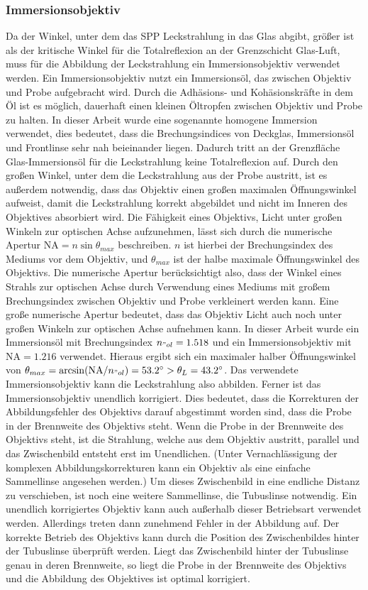 \documentclass[titlepage,  ngerman]{article}
\begin{document}
	\subsubsection{Immersionsobjektiv}
	Da der Winkel, unter dem das SPP Leckstrahlung in das Glas abgibt, größer ist als der kritische Winkel für die Totalreflexion an der Grenzschicht Glas-Luft, muss für die Abbildung der Leckstrahlung ein Immersionsobjektiv verwendet werden. Ein Immersionsobjektiv nutzt ein Immersionsöl, das zwischen Objektiv und Probe aufgebracht wird. Durch die Adhäsions- und Kohäsionskräfte in dem Öl ist es möglich, dauerhaft einen kleinen Öltropfen zwischen Objektiv und Probe zu halten. In dieser Arbeit  wurde eine sogenannte homogene Immersion verwendet, dies bedeutet, dass die Brechungsindices von Deckglas, Immersionsöl und Frontlinse sehr nah beieinander liegen. Dadurch tritt an der Grenzfläche Glas-Immersionsöl für die Leckstrahlung keine Totalreflexion auf. Durch den großen Winkel, unter dem die Leckstrahlung aus der Probe austritt, ist es außerdem notwendig, dass das Objektiv einen großen maximalen Öffnungswinkel aufweist, damit die Leckstrahlung korrekt abgebildet und nicht im Inneren des Objektives absorbiert wird. Die Fähigkeit eines Objektivs, Licht unter großen Winkeln zur optischen Achse aufzunehmen, lässt sich durch die numerische Apertur $\mathrm{NA} = n\sin\theta_{max}$ beschreiben. $n$ ist hierbei der Brechungsindex des Mediums vor dem Objektiv, und $\theta_{max}$ ist der halbe maximale Öffnungswinkel des Objektivs. Die numerische Apertur berücksichtigt also, dass der Winkel eines Strahls zur optischen Achse durch Verwendung eines Mediums mit großem Brechungsindex zwischen Objektiv und Probe verkleinert werden kann. Eine große numerische Apertur bedeutet, dass das Objektiv Licht auch noch unter großen Winkeln zur optischen Achse aufnehmen kann. In dieser Arbeit wurde ein Immersionsöl mit Brechungsindex $n_{"ol} = 1.518$ und ein Immersionsobjektiv mit $\mathrm{NA} = 1.216$ verwendet. Hieraus ergibt sich ein maximaler halber Öffnungswinkel von $\theta_{max} = \arcsin(\mathrm{NA} / n_{"ol}) = 53.2^\circ > \theta_L = 43.2^\circ$. Das verwendete Immersionsobjektiv kann die Leckstrahlung also abbilden. Ferner ist das Immersionsobjektiv unendlich korrigiert. Dies bedeutet, dass die Korrekturen der Abbildungsfehler des Objektivs darauf abgestimmt worden sind, dass die Probe in der Brennweite des Objektivs steht. Wenn die Probe in der Brennweite des Objektivs steht, ist die Strahlung, welche aus dem Objektiv austritt, parallel und das Zwischenbild entsteht erst im Unendlichen. (Unter Vernachlässigung der komplexen Abbildungskorrekturen kann ein Objektiv als eine einfache Sammellinse angesehen werden.) Um dieses Zwischenbild in eine endliche Distanz zu verschieben, ist noch eine weitere Sammellinse, die Tubuslinse notwendig. Ein unendlich korrigiertes Objektiv kann auch außerhalb dieser Betriebsart verwendet werden. Allerdings treten dann zunehmend Fehler in der Abbildung auf. Der korrekte Betrieb des Objektivs kann durch die Position des Zwischenbildes hinter der Tubuslinse überprüft werden. Liegt das Zwischenbild hinter der Tubuslinse genau in deren Brennweite, so liegt die Probe in der Brennweite des Objektivs und die Abbildung des Objektives ist optimal korrigiert.\cite{Kuhl.2018}
\end{document}
